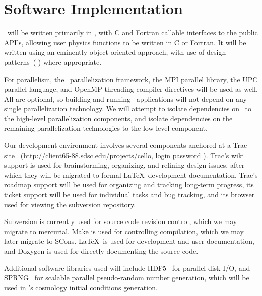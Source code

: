 \documentclass[10pt,twocolumn]{article}
\begin{document}
\section{Software Implementation} \label{s:implementation}

\cello\ will be written primarily in \cpp, with C and Fortran callable
interfaces to the public API's, allowing user physics functions to be
written in C or Fortran.  It will be written using an eminently
object-oriented approach, with use of design patterns~(\cite{GaHe95}
\cite{BuHe07}) where appropriate.

For parallelism, the \charm\ parallelization framework, the MPI
parallel library, the UPC parallel language, and OpenMP threading
compiler directives will be used as well.  All are optional, so
building and running \cello\ applications will not depend on any
single parallelization technology.  We will attempt to isolate
dependencies on \charm\ to the high-level parallelization components,
and isolate dependencies on the remaining parallelization technologies
to the low-level  component.

Our development environment involves several components anchored at a
Trac site~\cite{wwwtrac}
(\url{http://client65-88.sdsc.edu/projects/cello}, login 
password ).  Trac's wiki support is used for
brainstorming, organizing, and refining design issues, after which
they will be migrated to formal \LaTeX\ development documentation.
Trac's roadmap support will be used for organizing and tracking
long-term progress, its ticket support will be used for individual
tasks and bug tracking, and its browser used for viewing the
subversion repository.

Subversion is currently used for source code revision control, which
we may migrate to mercurial.  Make is used for controlling
compilation, which we may later migrate to SCons.  \LaTeX\ is used for
development and user documentation, and Doxygen is used for directly
documenting the source code.

Additional software libraries used will include HDF5~\cite{hdf5} for
parallel disk I/O, and SPRNG~\cite{wwwsprng} for scalable parallel
pseudo-random number generation, which will be used in \enzoii's
cosmology initial conditions generation.

\end{document}
